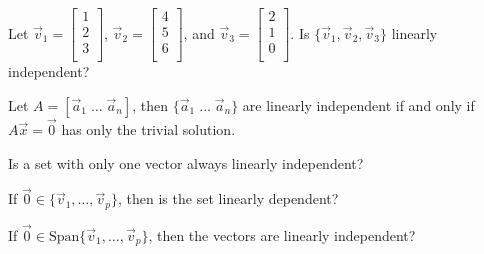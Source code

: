 \begin{enumerate}
\Problem Let $\vec{v}_1=\begin{bmatrix} 1\\2\\3\\ \end{bmatrix}$, $\vec{v}_2=\begin{bmatrix} 4\\5\\6\\ \end{bmatrix}$, and $\vec{v}_3=\begin{bmatrix} 2\\1\\0\\ \end{bmatrix}$. Is $\{ \vec{v}_1, \vec{v}_2,\vec{v}_3 \}$ linearly independent?

\vfill

\vfill

\vfill


Let $A= [\vec{a}_1 \; \dots \; \vec{a}_n ]$, then $\{ \vec{a}_1 \; \dots \; \vec{a}_n \}$ are linearly independent if and only if $A \vec{x} = \vec{0}$ has only the trivial solution.

\Problem Is a set with only one vector always linearly independent?

\vfill

\Problem If $\vec{0} \in \{ \vec{v}_1, \dots, \vec{v}_p \}$, then is the set linearly dependent?

\vfill

\Problem If $\vec{0} \in \text{Span}\{ \vec{v}_1, \dots, \vec{v}_p \}$, then the vectors are linearly independent?

\vfill

\end{enumerate}
%


